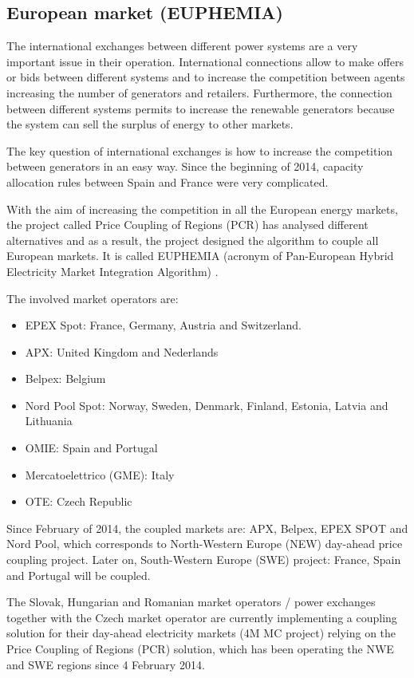 \documentclass[a4paper,11pt,twoside,openright]{report}
\begin{document}
\subsection{European market (EUPHEMIA)}
The international exchanges between different power systems are a very important issue in their operation. International connections allow to make offers or bids between different systems and to increase the competition between agents increasing the number of generators and retailers. Furthermore, the connection between different systems permits to increase the renewable generators because the system can sell the surplus of energy to other markets.

The key question of international exchanges is how to increase the competition between generators in an easy way. Since the beginning of 2014, capacity allocation rules between Spain and France were very complicated. 

With the aim of increasing the competition in all the European energy markets, the project called Price Coupling of Regions (PCR) has analysed different alternatives and as a result, the project designed the algorithm to couple all European markets. It is called EUPHEMIA (acronym of Pan-European Hybrid Electricity Market Integration Algorithm) \cite{euphemia}.

The involved market operators are: 
\begin{itemize}
	\item EPEX Spot: France, Germany, Austria and Switzerland.
	\item APX: United Kingdom and Nederlands
	\item Belpex: Belgium 
	\item Nord Pool Spot: Norway, Sweden, Denmark, Finland, Estonia, Latvia and Lithuania 
	\item OMIE: Spain and Portugal 
	\item Mercatoelettrico (GME): Italy
	\item OTE: Czech Republic
	
\end{itemize}

Since February of 2014, the coupled markets are: APX, Belpex, EPEX SPOT and Nord Pool, which corresponds to North-Western Europe (NEW) day-ahead price coupling project. Later on, South-Western Europe (SWE) project: France, Spain and Portugal will be coupled. 

The Slovak, Hungarian and Romanian market operators / power exchanges together with the Czech market operator are currently implementing a coupling solution for their day-ahead electricity markets (4M MC project) relying on the Price Coupling of Regions (PCR) solution, which has been operating the NWE and SWE regions since 4 February 2014.
\end{document}
